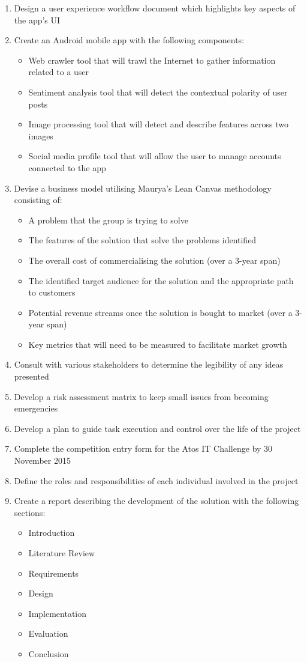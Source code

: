 \begin{enumerate}
	\item Design a user experience workflow document which highlights key aspects of the app's UI
	\item Create an Android mobile app with the following components:
		\begin{itemize}
			\item Web crawler tool that will trawl the Internet to gather information related to a user
			\item Sentiment analysis tool that will detect the contextual polarity of user posts
			\item Image processing tool that will detect and describe features across two images
			\item Social media profile tool that will allow the user to manage accounts connected to the app
		\end{itemize}
	\item Devise a business model utilising Maurya's Lean Canvas methodology consisting of:
		\begin{itemize}
			\item A problem that the group is trying to solve
			\item The features of the solution that solve the problems identified 
			\item The overall cost of commercialising the solution (over a 3-year span)
			\item The identified target audience for the solution and the appropriate path to customers
			\item Potential revenue streams once the solution is bought to market (over a 3-year span)
			\item Key metrics that will need to be measured to facilitate market growth
		\end{itemize}
	\item Consult with various stakeholders to determine the legibility of any ideas presented
	\item Develop a risk assessment matrix to keep small issues from becoming emergencies
	\item Develop a plan to guide task execution and control over the life of the project
	\item Complete the competition entry form for the Atos IT Challenge by 30 November 2015
	\item Define the roles and responsibilities of each individual involved in the project 
	\item Create a report describing the development of the solution with the following sections:
		\begin{itemize}
			\item Introduction
			\item Literature Review
			\item Requirements
			\item Design
			\item Implementation
			\item Evaluation
			\item Conclusion
		\end{itemize}
\end{enumerate}

